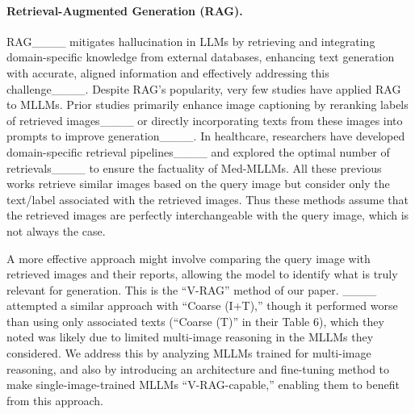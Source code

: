 \paragraph{Retrieval-Augmented Generation (RAG).} 
RAG____ mitigates hallucination in LLMs by retrieving and integrating domain-specific knowledge from external databases, enhancing text generation with accurate, aligned information and effectively addressing this challenge____.
Despite RAG's popularity, very few studies have applied RAG to MLLMs. 
Prior studies primarily enhance image captioning by reranking labels of retrieved images____ or directly incorporating texts from these images into prompts to improve generation____. 
In healthcare, researchers have developed domain-specific retrieval pipelines____ and explored the optimal number of retrievals____ to ensure the factuality of Med-MLLMs.
All these previous works retrieve similar images based on the query image but consider only the text/label associated with the retrieved images.
Thus these methods assume that the retrieved images are perfectly interchangeable with the query image, which is not always the case. 

A more effective approach might involve comparing the query image with retrieved images and their reports, allowing the model to identify what is truly relevant for generation.  This is the ``V-RAG'' method of our paper.
____ attempted a similar approach with ``Coarse (I+T),'' though it performed worse than using only associated texts (``Coarse (T)'' in their Table 6), which they noted was likely due to limited multi-image reasoning in the MLLMs they considered. 
We address this by analyzing MLLMs trained for multi-image reasoning, and also by introducing an architecture and fine-tuning method to make single-image-trained MLLMs ``V-RAG-capable,'' enabling them to benefit from this approach.